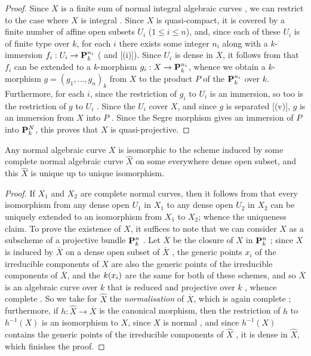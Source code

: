 \begin{proof}
Since $X$ is a finite sum of normal integral algebraic curves , we can restrict to the case where $X$ is integral .
Since $X$ is quasi-compact, it is covered by a finite number of affine open subsets $U_i$ ($1\leq i\leq n$), and, since each of these $U_i$ is of finite type over $k$, for each $i$ there exists some integer $n_i$ along with a $k$-immersion $f_i:U_i\to\bb{P}_k^{n_i}$ ( and [(i)]).
Since $U_i$ is dense in $X$, it follows from  that $f_i$ can be extended to a $k$-morphism $g_i:X\to\bb{P}_k^{n_i}$, whence we obtain a $k$-morphism $g=(g_1,\ldots,g_n)_k$ from $X$ to the product $P$ of the $\mathbf{P}_k^{n_i}$ over $k$.
Furthermore, for each $i$, since the restriction of $g_i$ to $U_i$ is an immersion, so too is the restriction of $g$ to $U_i$ .
Since the $U_i$ cover $X$, and since $g$ is separated [(v)], $g$ is an immersion from $X$ into $P$ .
Since the Segre morphism  gives an immersion of $P$ into $\mathbf{P}_k^N$, this proves that $X$ is quasi-projective.
\end{proof}

\begin{corollary}[7.4.11]
\label{II.7.4.11}
Any normal algebraic curve $X$ is isomorphic to the scheme induced by some complete normal algebraic curve $\widehat{X}$ on some everywhere dense open subset, and this $\widehat{X}$ is unique up to unique isomorphism.
\end{corollary}

\begin{proof}
If $X_1$ and $X_2$ are complete normal curves, then it follows from  that every isomorphism from any dense open $U_1$ in $X_1$ to any dense open $U_2$ in $X_2$ can be uniquely extended to an isomorphism from $X_1$ to $X_2$;
whence the uniqueness claim.
To prove the existence of $\widehat{X}$, it suffices to note that we can consider $X$ as a subscheme of a projective bundle $\mathbf{P}_k^n$ .
Let $\overline{X}$ be the closure of $X$ in $\mathbf{P}_k^n$ ;
since $X$ is induced by $\overline{X}$ on a dense open subset of $\overline{X}$ , the generic points $x_i$ of the irreducible components of $X$ are also the generic points of the irreducible components of $\overline{X}$, and the $k(x_i)$ are the same for both of these schemes, and so  $\overline{X}$ is an algebraic curve over $k$ that is reduced  and projective over $k$ , whence complete .
So we take for $\widehat{X}$ the \emph{normalisation} of $\overline{X}$, which is again complete ;
furthermore, if $h:\widehat{X}\to\overline{X}$ is the canonical morphism, then the restriction of $h$ to $h^{-1}(X)$ is an isomorphism to $X$, since $X$ is normal , and since $h^{-1}(X)$ contains the generic points of the irreducible components of $\widehat{X}$ , it is dense in $\widehat{X}$, which finishes the proof.
\end{proof}

